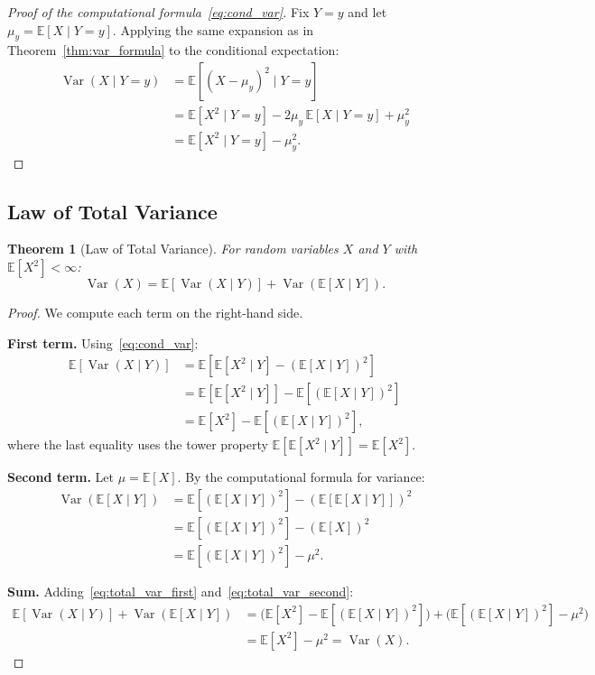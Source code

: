 \documentclass[11pt,a4paper]{article}
\theoremstyle{definition}
\theoremstyle{plain}
\newtheorem{theorem}{Theorem}[section]
\theoremstyle{remark}
\DeclareMathOperator{\Var}{Var}
\newcommand{\E}{\mathbb{E}}
\begin{document}
\begin{proof}[Proof of the computational formula~\eqref{eq:cond_var}]
Fix $Y = y$ and let $\mu_y = \E[X \mid Y = y]$. Applying the same expansion as in Theorem~\ref{thm:var_formula} to the conditional expectation:
\begin{align}
    \Var(X \mid Y = y) &= \E[(X - \mu_y)^2 \mid Y = y] \nonumber\\
    &= \E[X^2 \mid Y = y] - 2\mu_y\,\E[X \mid Y = y] + \mu_y^2 \nonumber\\
    &= \E[X^2 \mid Y = y] - \mu_y^2. \label{eq:cond_var_proof}
\end{align}
\end{proof}

\subsection{Law of Total Variance}
\label{subsec:total_var}

\begin{keyresult}
\begin{theorem}[Law of Total Variance]
\label{thm:total_variance}
For random variables $X$ and $Y$ with $\E[X^2] < \infty$:
\begin{equation}
    \Var(X) = \E\!\left[\Var(X \mid Y)\right] + \Var\!\left(\E[X \mid Y]\right).
    \label{eq:total_variance}
\end{equation}
\end{theorem}
\end{keyresult}

\begin{proof}
We compute each term on the right-hand side.

\textbf{First term.} Using~\eqref{eq:cond_var}:
\begin{align}
    \E[\Var(X \mid Y)]
    &= \E\!\left[\E[X^2 \mid Y] - (\E[X \mid Y])^2\right] \nonumber\\
    &= \E[\E[X^2 \mid Y]] - \E[(\E[X \mid Y])^2] \nonumber\\
    &= \E[X^2] - \E[(\E[X \mid Y])^2], \label{eq:total_var_first}
\end{align}
where the last equality uses the tower property $\E[\E[X^2 \mid Y]] = \E[X^2]$.

\textbf{Second term.} Let $\mu = \E[X]$. By the computational formula for variance:
\begin{align}
    \Var(\E[X \mid Y])
    &= \E[(\E[X \mid Y])^2] - (\E[\E[X \mid Y]])^2 \nonumber\\
    &= \E[(\E[X \mid Y])^2] - (\E[X])^2 \nonumber\\
    &= \E[(\E[X \mid Y])^2] - \mu^2. \label{eq:total_var_second}
\end{align}

\textbf{Sum.} Adding~\eqref{eq:total_var_first} and~\eqref{eq:total_var_second}:
\begin{align}
    \E[\Var(X \mid Y)] + \Var(\E[X \mid Y])
    &= \bigl(\E[X^2] - \E[(\E[X \mid Y])^2]\bigr) + \bigl(\E[(\E[X \mid Y])^2] - \mu^2\bigr) \nonumber\\
    &= \E[X^2] - \mu^2 = \Var(X). \label{eq:total_var_sum}
\end{align}
\end{proof}
\end{document}
